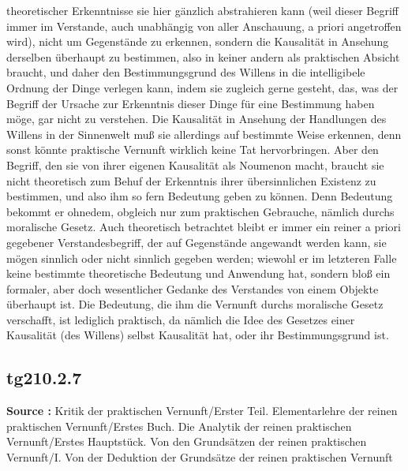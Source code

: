 \documentclass[a4paper,12pt,twoside]{book}
\begin{document}
theoretischer Erkenntnisse sie hier gänzlich abstrahieren kann (weil dieser Begriff immer im Verstande, auch unabhängig von aller Anschauung, a priori angetroffen wird), nicht um Gegenstände zu erkennen, sondern die Kausalität in Ansehung derselben überhaupt zu bestimmen, also in keiner andern als praktischen Absicht braucht, und daher den Bestimmungsgrund des Willens in die intelligibele Ordnung der Dinge verlegen kann, indem sie zugleich gerne gesteht, das, was der Begriff der Ursache zur Erkenntnis dieser Dinge für eine Bestimmung haben möge, gar nicht zu verstehen. Die Kausalität in Ansehung der Handlungen des Willens in der Sinnenwelt muß sie allerdings auf bestimmte Weise erkennen, denn sonst könnte praktische Vernunft wirklich keine Tat hervorbringen. Aber den Begriff, den sie von ihrer eigenen Kausalität als Noumenon macht, braucht sie nicht theoretisch zum Behuf der Erkenntnis ihrer übersinnlichen Existenz zu bestimmen, und also ihm so fern Bedeutung geben zu können. Denn Bedeutung bekommt  er ohnedem, obgleich nur zum praktischen Gebrauche, nämlich durchs moralische Gesetz. Auch theoretisch betrachtet bleibt er immer ein reiner a priori gegebener Verstandesbegriff, der auf Gegenstände angewandt werden kann, sie mögen sinnlich oder nicht sinnlich gegeben werden; wiewohl er im letzteren Falle keine bestimmte theoretische Bedeutung und Anwendung hat, sondern bloß ein formaler, aber doch wesentlicher Gedanke des Verstandes von einem Objekte überhaupt ist. Die Bedeutung, die ihm die Vernunft durchs moralische Gesetz verschafft, ist lediglich praktisch, da nämlich die Idee des Gesetzes einer Kausalität (des Willens) selbst Kausalität hat, oder ihr Bestimmungsgrund ist. 
	
	\subsection*{tg210.2.7} 
	\textbf{Source : }Kritik der praktischen Vernunft/Erster Teil. Elementarlehre der reinen praktischen Vernunft/Erstes Buch. Die Analytik der reinen praktischen Vernunft/Erstes Hauptstück. Von den Grundsätzen der reinen praktischen Vernunft/I. Von der Deduktion der Grundsätze der reinen praktischen Vernunft\\  
	
\end{document}
